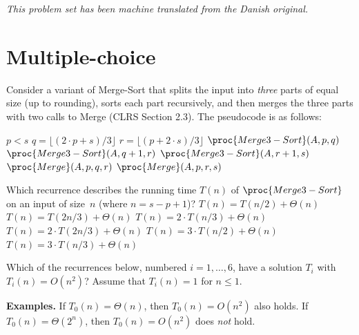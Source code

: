 \noindent\emph{This problem set has been machine translated from the Danish original.}
\medskip

\section*{Multiple-choice}\label{sec:mc}


\multiplechoicestart


Consider a variant of {\sc Merge-Sort} that splits the input into \emph{three} parts of equal size (up to rounding), sorts each part recursively, and then merges the three parts with two calls to {\sc Merge} (CLRS Section 2.3). The pseudocode is as follows:
\begin{codebox}
  \li \If $p<s$ \Do
  \li $q = \lfloor (2\cdot p+ s)/3\rfloor$
  \li $r = \lfloor (p+2\cdot s)/3\rfloor$
  \li $\proc{Merge3-Sort}(A, p, q)$
  \li $\proc{Merge3-Sort}(A, q+1, r)$
  \li $\proc{Merge3-Sort}(A, r+1, s)$
  \li $\proc{Merge}(A, p, q, r)$
  \li $\proc{Merge}(A, p, r, s)$ \End
\end{codebox}

\noindent
Which recurrence describes the running time $T(n)$ of $\proc{Merge3-Sort}$ on an input of size~$n$ (where $n = s - p + 1$)?
\oneanswer
\optionsstart
\answer $T(n) = T(n/2) + \Theta(n)$
\answer $T(n) = T(2n/3) + \Theta(n)$
\answer $T(n) = 2\cdot T(n/3) + \Theta(n)$
\answer $T(n) = 2\cdot T(2n/3) + \Theta(n)$
\answer $T(n) = 3\cdot T(n/2) + \Theta(n)$
\answer $T(n) = 3\cdot T(n/3) + \Theta(n)$ \correct
\optionsend





Which of the recurrences below, numbered $i=1,\dots,6$, have a solution $T_i$ with $T_i(n) = O(n^2)$?
Assume that $T_i(n) = 1$ for $n\leq 1$. \multipleanswers

\medskip\noindent
{\bf Examples.} If $T_0(n) = \Theta(n)$, then $T_0(n) = O(n^2)$ also holds. If $T_0(n) = \Theta(2^n)$, then $T_0(n) = O(n^2)$ does \emph{not} hold.

